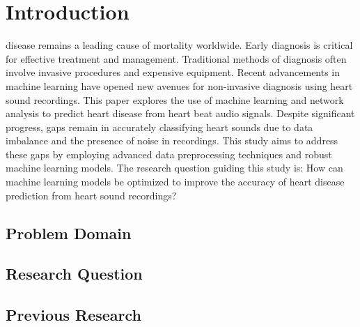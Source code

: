 \section{Introduction}
 disease remains a leading cause of mortality worldwide.
Early diagnosis is critical for effective treatment and management.
Traditional methods of diagnosis often involve invasive procedures and expensive equipment.
Recent advancements in machine learning have opened new avenues for non-invasive diagnosis using heart sound recordings.
This paper explores the use of machine learning and network analysis to predict heart disease from heart beat audio signals.
Despite significant progress, gaps remain in accurately classifying heart sounds due to data imbalance and the presence of noise in recordings.
This study aims to address these gaps by employing advanced data preprocessing techniques and robust machine learning models.
The research question guiding this study is: How can machine learning models be optimized to improve the accuracy of heart disease prediction
from heart sound recordings?

\subsection{Problem Domain}

\subsection{Research Question}

\subsection{Previous Research}